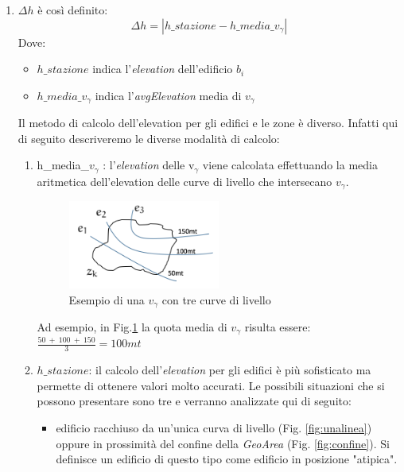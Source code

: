 \begin{enumerate}
\item $\Delta{h}$ è così definito:
\begin{equation}
 \Delta{h} =  | h\_stazione - h\_media\_v_\gamma |
 \end{equation}
Dove: 
\begin{itemize}
\item $ h\_stazione$ indica l'\textit{elevation} dell'edificio $b_i$
\item $ h\_media\_v_\gamma$ indica l'\textit{avgElevation} media di $v_\gamma$
\end{itemize}
Il metodo di calcolo dell'elevation per gli edifici e le zone è diverso. Infatti qui di seguito descriveremo le diverse modalità di calcolo:
\begin{enumerate}
\item h\_media\_$v_\gamma$ : l'\textit{elevation} delle v$_\gamma$ viene calcolata effettuando la media aritmetica dell'elevation delle curve di livello che intersecano $v_\gamma$.

\begin{figure}[h]
  \centering
    \includegraphics[width=0.5\textwidth]{img/altezzaZK}
      \caption{Esempio di una $v_\gamma$ con tre curve di livello}
      \label{fig:altezzaZK}
\end{figure}
Ad esempio, in Fig.\ref{fig:altezzaZK} la quota media di $v_\gamma$ risulta essere: \newline
$\frac{50\ +\ 100\ +\ 150}{3} = 100 mt$

\item $h\_{stazione}$: il calcolo dell'\textit{elevation} per gli edifici è più sofisticato ma permette di ottenere valori molto accurati.
Le possibili situazioni che si possono presentare sono tre e verranno analizzate qui di seguito:
\begin{itemize}
\item edificio racchiuso da un'unica curva di livello (Fig. \ref{fig:unalinea}) oppure in prossimità del confine della \textit{GeoArea} (Fig. \ref{fig:confine}). Si definisce un edificio di questo tipo come edificio in posizione "atipica".


\end{itemize}
\end{enumerate}
\end{enumerate}
